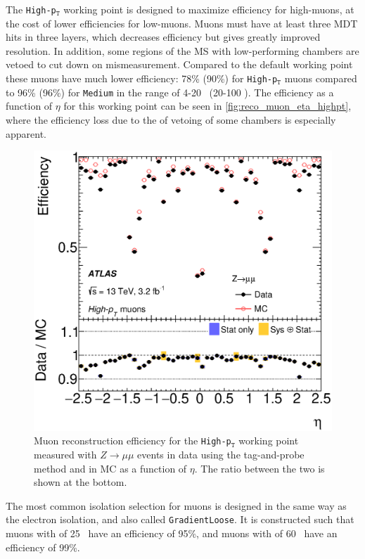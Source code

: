 The \texttt{High-p$_\texttt{T}$} working point is designed to maximize efficiency for high-\pt muons, at the cost of lower efficiencies for low-\pt muons. Muons must have at least three \ac{MDT} hits in three layers, which decreases efficiency but gives greatly improved \pt resolution. In addition, some regions of the \ac{MS} with low-performing chambers are vetoed to cut down on mismeasurement. Compared to the default working point these muons have much lower efficiency: 78\% (90\%) for \texttt{High-p$_\texttt{T}$} muons compared to 96\% (96\%) for \texttt{Medium} in the \pt range of 4-20 \gev~(20-100 \gev). The efficiency as a function of $\eta$ for this working point can be seen in \autoref{fig:reco_muon_eta_highpt}, where the efficiency loss due to the of vetoing of some chambers is especially apparent.

\begin{centering}
\begin{figure}[!hbt]
\myfloatalign
\includegraphics[width=.9\linewidth]{figures/reco/fig_03c.eps}
\caption{Muon reconstruction efficiency for the \texttt{High-p$_\texttt{T}$} working point measured with $Z\rightarrow\mu\mu$ events in data using the tag-and-probe method and in \ac{MC} as a function of $\eta$. The ratio between the two is shown at the bottom. \cite{1603.05598} }
\label{fig:reco_muon_eta_highpt}
\end{figure}
\end{centering}

The most common isolation selection for muons is designed in the same way as the electron isolation, and also called \texttt{GradientLoose}. It is constructed such that muons with \pt of 25 \gev~have an efficiency of 95\%, and muons with \pt of 60 \gev~have an efficiency of 99\%. 

